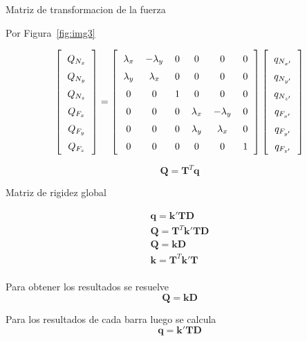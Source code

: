 \documentclass{beamer}
\begin{document}
\begin{frame}{Matriz de transformacion de la fuerza}

  Por Figura~\ref{fig:img3}


\[
\setlength{\arraycolsep}{6pt}
\renewcommand{\arraystretch}{1.5}
\left[
\begin{array}{c}
Q_{N_{x}} \\
Q_{N_{y}} \\
Q_{N_{z}} \\
Q_{F_{x}} \\
Q_{F_{y}} \\
Q_{F_{z}}
\end{array}
\right]
=
\left[
\begin{array}{cccccc}
\lambda_x & -\lambda_y & 0 & 0 & 0 & 0 \\
\lambda_y & \lambda_x & 0 & 0 & 0 & 0 \\
0 & 0 & 1 & 0 & 0 & 0 \\
0 & 0 & 0 & \lambda_x & -\lambda_y & 0 \\
0 & 0 & 0 & \lambda_y & \lambda_x & 0 \\
0 & 0 & 0 & 0 & 0 & 1
\end{array}
\right]
\left[
\begin{array}{c}
q_{N_{x'}} \\
q_{N_{y'}} \\
q_{N_{z'}} \\
q_{F_{x'}} \\
q_{F_{y'}} \\
q_{F_{z'}}
\end{array}
\right]
\]

        \[
        \mathbf{Q} = \mathbf{T}^T \mathbf{q}
        \]

\end{frame}

\begin{frame}{Matriz de rigidez global}

    \begin{gather*}
    \mathbf{q} = \mathbf{k'}\mathbf{T} \mathbf{D} \\
    \mathbf{Q} = \mathbf{T}^T\mathbf{k'}\mathbf{T}\mathbf{D} \\
    \mathbf{Q} =\mathbf{k}\mathbf{D} \\
    \mathbf{k} = \mathbf{T}^T\mathbf{k'}\mathbf{T} \\
    \end{gather*}

    Para obtener los resultados se resuelve
    \[\mathbf{Q} =\mathbf{k}\mathbf{D}\]

    Para los resultados de cada barra luego se calcula
    \[\mathbf{q} = \mathbf{k'}\mathbf{T} \mathbf{D}\]


\end{frame}
\end{document}
